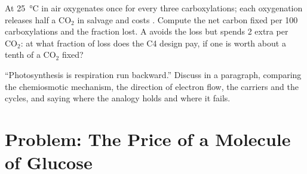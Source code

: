 \begin{exercise}[$\star\star\star$]\label{exo:b1:photosynthesis:11}
At \qty{25}{\celsius} in air  oxygenates once for every three
carboxylations; each oxygenation releases half a $\mathrm{CO_2}$ in
salvage and costs . Compute the net carbon fixed per 100
carboxylations and the fraction lost. A  avoids the loss but
spends 2 extra  per $\mathrm{CO_2}$: at what fraction of loss does
the C4 design pay, if one  is worth about a tenth of a $\mathrm{CO_2}$
fixed?
\end{exercise}

\begin{exercise}[$\star\star\star$]\label{exo:b1:photosynthesis:12}
``Photosynthesis is respiration run backward.'' Discuss in a paragraph,
comparing the chemiosmotic mechanism, the direction of electron flow,
the carriers and the cycles, and saying where the analogy holds and
where it fails.
\end{exercise}

\section{Problem: The Price of a Molecule of Glucose}

